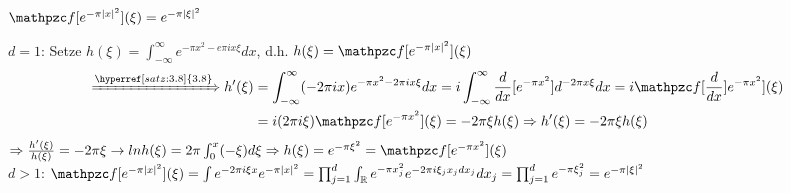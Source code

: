 \begin{beispielnbr}
	$\ff[e^{-\pi |x|^{2}}](\xi) = e^{-\pi|\xi|^{2}}$
\end{beispielnbr}

\begin{beweis}
	$d = 1$: Setze $h(\xi) = \int_{-\infty}^{\infty} e^{- \pi x^{2} - e \pi i x \xi} dx$, d.h. $h(\xi) = \ff[e^{-\pi|x|^{2}}](\xi)$
	\begin{align*}
		\xRightarrow[]{\hyperref[satz:3.8]{3.8}} h'(\xi) & = \int_{-\infty}^{\infty} (-2\pi i x)e^{-\pi x^{2} - 2 \pi i x \xi} dx = i \int_{-\infty}^{\infty} \frac{d}{dx} [e^{- \pi x^{2}}]d^{-2\pi x \xi} dx = i \ff [\frac{d}{dx}] e^{-\pi x^{2}}](\xi) \\
		& = i(2\pi i \xi) \ff[e^{-\pi x^{2}}](\xi) = - 2 \pi \xi h(\xi) \Rightarrow h'(\xi) = - 2 \pi \xi h(\xi)
	\end{align*}
	$\Rightarrow \frac{h'(\xi)}{h(\xi)} = - 2 \pi \xi \rightarrow ln h(\xi) = 2 \pi \int_{0}^{x}(-\xi) d\xi \Rightarrow h(\xi) = e^{- \pi \xi^{2}} = \ff[e^{-\pi x^{2}}](\xi) $ \\
	$d > 1$: $\ff[e^{-\pi|x|^{2}}](\xi) = \int e^{-2\pi i \xi x} e^{- \pi |x|^{2}} = \prod_{j = 1}^{d} \int_{\R} e^{-\pi x_{j}^{2}} e^{-2\pi i \xi_{j} x_{j} dx_{j}} dx_{j} = \prod_{j = 1}^{d}e^{-\pi \xi_{j}^{2}} = e^{- \pi |\xi|^{2}}$
\end{beweis}


 
\newpage